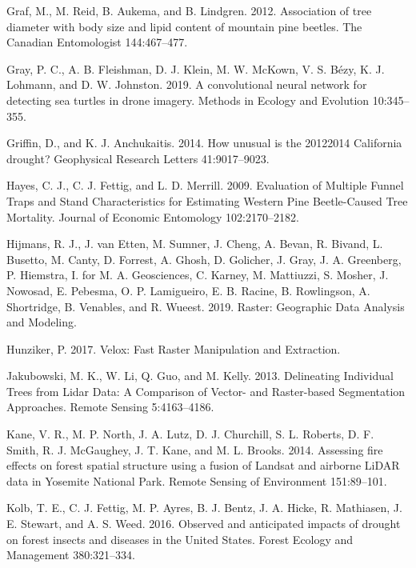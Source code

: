 \documentclass[]{article}
\begin{document}
\hypertarget{ref-graf2012}{}
Graf, M., M. Reid, B. Aukema, and B. Lindgren. 2012. Association of tree
diameter with body size and lipid content of mountain pine beetles. The
Canadian Entomologist 144:467--477.

\hypertarget{ref-gray2019}{}
Gray, P. C., A. B. Fleishman, D. J. Klein, M. W. McKown, V. S. Bézy, K.
J. Lohmann, and D. W. Johnston. 2019. A convolutional neural network for
detecting sea turtles in drone imagery. Methods in Ecology and Evolution
10:345--355.

\hypertarget{ref-griffin2014}{}
Griffin, D., and K. J. Anchukaitis. 2014. How unusual is the 20122014
California drought? Geophysical Research Letters 41:9017--9023.

\hypertarget{ref-hayes2009}{}
Hayes, C. J., C. J. Fettig, and L. D. Merrill. 2009. Evaluation of
Multiple Funnel Traps and Stand Characteristics for Estimating Western
Pine Beetle-Caused Tree Mortality. Journal of Economic Entomology
102:2170--2182.

\hypertarget{ref-hijmans2019}{}
Hijmans, R. J., J. van Etten, M. Sumner, J. Cheng, A. Bevan, R. Bivand,
L. Busetto, M. Canty, D. Forrest, A. Ghosh, D. Golicher, J. Gray, J. A.
Greenberg, P. Hiemstra, I. for M. A. Geosciences, C. Karney, M.
Mattiuzzi, S. Mosher, J. Nowosad, E. Pebesma, O. P. Lamigueiro, E. B.
Racine, B. Rowlingson, A. Shortridge, B. Venables, and R. Wueest. 2019.
Raster: Geographic Data Analysis and Modeling.

\hypertarget{ref-hunziker2017}{}
Hunziker, P. 2017. Velox: Fast Raster Manipulation and Extraction.

\hypertarget{ref-jakubowski2013}{}
Jakubowski, M. K., W. Li, Q. Guo, and M. Kelly. 2013. Delineating
Individual Trees from Lidar Data: A Comparison of Vector- and
Raster-based Segmentation Approaches. Remote Sensing 5:4163--4186.

\hypertarget{ref-kane2014}{}
Kane, V. R., M. P. North, J. A. Lutz, D. J. Churchill, S. L. Roberts, D.
F. Smith, R. J. McGaughey, J. T. Kane, and M. L. Brooks. 2014. Assessing
fire effects on forest spatial structure using a fusion of Landsat and
airborne LiDAR data in Yosemite National Park. Remote Sensing of
Environment 151:89--101.

\hypertarget{ref-kolb2016}{}
Kolb, T. E., C. J. Fettig, M. P. Ayres, B. J. Bentz, J. A. Hicke, R.
Mathiasen, J. E. Stewart, and A. S. Weed. 2016. Observed and anticipated
impacts of drought on forest insects and diseases in the United States.
Forest Ecology and Management 380:321--334.
\end{document}
